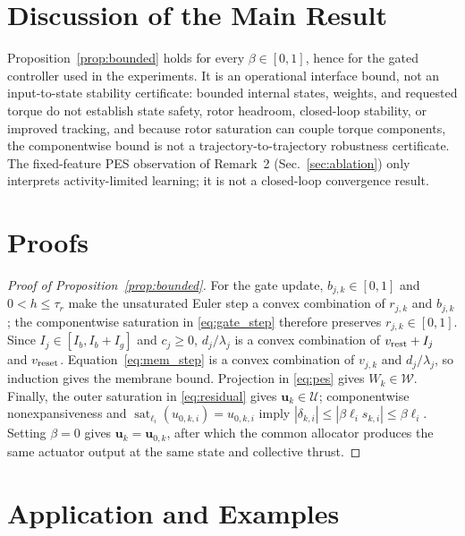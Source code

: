 \documentclass[letterpaper, 10 pt, conference]{ieeeconf}
\newcommand{\sat}{\operatorname{sat}}
\begin{document}
\section{Discussion of the Main Result}
\label{sec:discussion}
Proposition~\ref{prop:bounded} holds for every $\beta\in[0,1]$, hence for the gated controller used in the experiments. It is an operational interface bound, not an input-to-state stability certificate: bounded internal states, weights, and requested torque do not establish state safety, rotor headroom, closed-loop stability, or improved tracking, and because rotor saturation can couple torque components, the componentwise bound is not a trajectory-to-trajectory robustness certificate. The fixed-feature PES observation of Remark~2 (Sec.~\ref{sec:ablation}) only interprets activity-limited learning; it is not a closed-loop convergence result.

\section{Proofs}
\label{sec:proofs}
\begin{proof}[Proof of Proposition~\ref{prop:bounded}]
For the gate update, $b_{j,k}\in[0,1]$ and $0<h\le\tau_r$ make the unsaturated Euler step a convex combination of $r_{j,k}$ and $b_{j,k}$; the componentwise saturation in \eqref{eq:gate_step} therefore preserves $r_{j,k}\in[0,1]$. Since $I_j\in[I_b,I_b+I_g]$ and $c_j\ge0$, $d_j/\lambda_j$ is a convex combination of $v_{\rm rest}+I_j$ and $v_{\rm reset}$. Equation~\eqref{eq:mem_step} is a convex combination of $v_{j,k}$ and $d_j/\lambda_j$, so induction gives the membrane bound. Projection in \eqref{eq:pes} gives $W_k\in\mathcal W$. Finally, the outer saturation in \eqref{eq:residual} gives $\bm u_k\in\mathcal U$; componentwise nonexpansiveness and $\sat_{\ell_i}(u_{0,k,i})=u_{0,k,i}$ imply $|\delta_{k,i}|\le|\beta\ell_i s_{k,i}|\le\beta\ell_i$. Setting $\beta=0$ gives $\bm u_k=\bm u_{0,k}$, after which the common allocator produces the same actuator output at the same state and collective thrust.
\end{proof}



\section{Application and Examples}
\label{sec:application}
\end{document}
